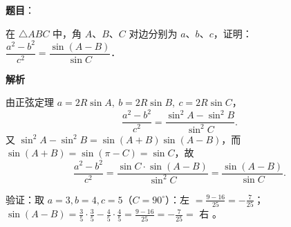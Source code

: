 \begin{answer}

\textbf{题目}：

在 $\triangle ABC$ 中，角 $A$、$B$、$C$ 对边分别为 $a$、$b$、$c$，证明：$\dfrac{a^2 - b^2}{c^2} = \dfrac{\sin(A - B)}{\sin C}$．

\textbf{解析}

由正弦定理 $a=2R\sin A,\ b=2R\sin B,\ c=2R\sin C$，
\nopagebreak[4]
\[\frac{a^2-b^2}{c^2}=\frac{\sin^2A-\sin^2B}{\sin^2C}.\]
又 $\sin^2A-\sin^2B=\sin(A+B)\sin(A-B)$，而 $\sin(A+B)=\sin(\pi-C)=\sin C$，故
\nopagebreak[4]
\[\frac{a^2-b^2}{c^2}=\frac{\sin C\cdot\sin(A-B)}{\sin^2C}=\frac{\sin(A-B)}{\sin C}.\]

验证：取 $a=3,b=4,c=5$（$C=90^\circ$）：左 $=\frac{9-16}{25}=-\frac{7}{25}$；$\sin(A-B)=\frac35\cdot\frac35-\frac45\cdot\frac45=\frac{9-16}{25}=-\frac{7}{25}=$ 右 。


\end{answer}
